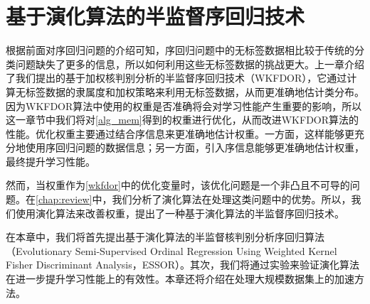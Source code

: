 \chapter{基于演化算法的半监督序回归技术}
\label{chap:essor}
根据前面对序回归问题的介绍可知，序回归问题中的无标签数据相比较于传统的分类问题缺失了更多的信息，所以如何利用这些无标签数据的挑战更大。上一章介绍了我们提出的基于加权核判别分析的半监督序回归技术（WKFDOR），它通过计算无标签数据的隶属度和加权策略来利用无标签数据，从而更准确地估计类分布。因为WKFDOR算法中使用的权重是否准确将会对学习性能产生重要的影响，所以这一章节中我们将对\autoref{alg_mem}得到的权重进行优化，从而改进WKFDOR算法的性能。优化权重主要通过结合序信息来更准确地估计权重。一方面，这样能够更充分地使用序回归问题的数据信息；另一方面，引入序信息能够更准确地估计权重，最终提升学习性能。

然而，当权重作为\autoref{wkfdor}中的优化变量时，该优化问题是一个非凸且不可导的问题。在\autoref{chap:review}中，我们分析了演化算法在处理这类问题中的优势。所以，我们使用演化算法来改善权重，提出了一种基于演化算法的半监督序回归技术。

在本章中，我们将首先提出基于演化算法的半监督核判别分析序回归算法（Evolutionary Semi-Supervised Ordinal Regression Using Weighted Kernel Fisher Discriminant Analysis，ESSOR）。其次，我们将通过实验来验证演化算法在进一步提升学习性能上的有效性。本章还将介绍在处理大规模数据集上的加速方法。


